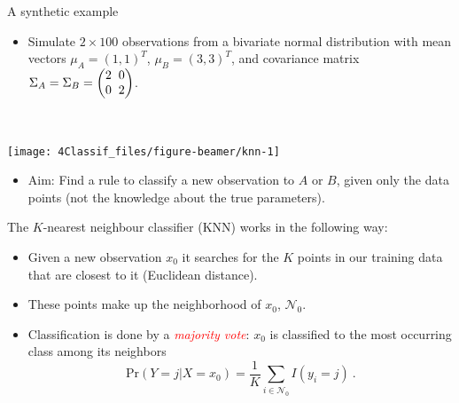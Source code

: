 \documentclass[
  10pt,
  ignorenonframetext,
]{beamer}
\providecommand{\tightlist}{%
  \setlength{\itemsep}{0pt}\setlength{\parskip}{0pt}}
\begin{document}
\begin{frame}
\begin{block}{A synthetic example}
\protect\hypertarget{a-synthetic-example}{}
\(~\)

\begin{itemize}
\tightlist
\item
  Simulate \(2\times 100\) observations from a bivariate normal
  distribution with mean vectors \(\mu_A = (1, 1)^T\),
  \(\mu_B = (3, 3)^T\), and covariance matrix
  \(\Sigma_A = \Sigma_B = \begin{pmatrix} 2\hspace{2mm} 0 \\ 0 \hspace{2mm} 2 \end{pmatrix}\).
\end{itemize}

\(~\)

\begin{center}\texttt{[image: 4Classif\_files/figure-beamer/knn-1]} \end{center}

\vspace{2mm}

\begin{itemize}
\tightlist
\item
  Aim: Find a rule to classify a new observation to \(A\) or \(B\),
  given only the data points (not the knowledge about the true
  parameters).
\end{itemize}
\end{block}
\end{frame}

\begin{frame}
\vspace{2mm}

The \(K\)-nearest neighbour classifier (KNN) works in the following way:

\begin{itemize}
\item
  Given a new observation \(x_0\) it searches for the \(K\) points in
  our training data that are closest to it (Euclidean distance).
  \vspace{1mm}
\item
  These points make up the neighborhood of \(x_0\), \(\mathcal{N}_0\).
  \vspace{1mm}
\item
  Classification is done by a \emph{\textcolor{red}{majority vote}}:
  \(x_0\) is classified to the most occurring class among its neighbors
  \[\text{Pr}(Y=j | X = x_0) = \frac{1}{K} \sum_{i \in \mathcal{N}_0} I(y_i = j)\ .\]
\end{itemize}
\end{frame}
\end{document}
